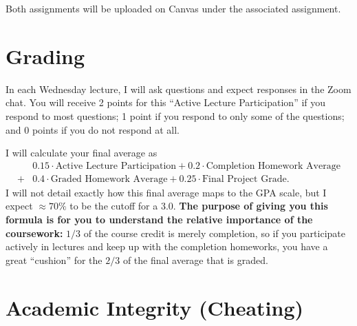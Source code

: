 \documentclass[12pt]{article}
\begin{document}
Both assignments will be uploaded on Canvas under the associated assignment.

\section*{Grading}

In each Wednesday lecture, I will ask questions and expect responses in the Zoom chat. You will receive 2 points for this ``Active Lecture Participation'' if you respond to most questions; 1 point if you respond to only some of the questions; and 0 points if you do not respond at all.

I will calculate your final average as 
\begin{align*}
&0.15 \cdot \text{Active Lecture Participation} + 0.2 \cdot \text{Completion Homework Average} \\ + &0.4 \cdot \text{Graded Homework Average} + 0.25 \cdot \text{Final Project Grade}.
\end{align*}
I will not detail exactly how this final average maps to the GPA scale, but I expect $\approx 70\%$ to be the cutoff for a 3.0. \textbf{The purpose of giving you this formula is for you to understand the relative importance of the coursework:} $1/3$ of the course credit is merely completion, so if you participate actively in lectures and keep up with the completion homeworks, you have a great ``cushion'' for the $2/3$ of the final average that is graded.

\section*{Academic Integrity (Cheating)}
\end{document}
